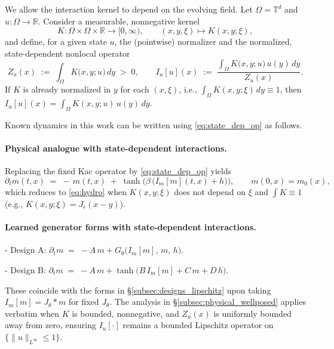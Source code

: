 \documentclass[11pt,a4paper]{article}
\theoremstyle{plain}
\theoremstyle{definition}
\theoremstyle{remark}
\begin{document}
We allow the interaction kernel to depend on the evolving field. Let $\Omega=\mathbb{T}^d$ and $u:\Omega\to\mathbb{R}$. Consider a measurable, nonnegative kernel
\[
	K: \Omega\times\Omega\times\mathbb{R} \to [0,\infty),\qquad (x,y,\xi)\mapsto K(x,y;\xi),
\]
and define, for a given state $u$, the (pointwise) normalizer and the normalized, state-dependent nonlocal operator
\begin{equation}
	Z_u(x) \;:=\; \int_{\Omega} K\big(x,y; u\big)\,dy\;>\;0,\qquad
	I_u[u](x) \;:=\; \frac{\displaystyle \int_{\Omega} K\big(x,y; u\big)\,u(y)\,dy}{\displaystyle Z_u(x)}.
	\label{eq:state_dep_op}
\end{equation}
If $K$ is already normalized in $y$ for each $(x,\xi)$, i.e., $\int_{\Omega}K(x,y;\xi)\,dy\equiv1$, then $I_u[u](x)=\int_{\Omega}K(x,y;u)\,u(y)\,dy$.

Known dynamics in this work can be written using \eqref{eq:state_dep_op} as follows.

\paragraph{Physical analogue with state-dependent interactions.}
Replacing the fixed Kac operator by \eqref{eq:state_dep_op} yields
\begin{equation}
	\partial_t m(t,x) \;=\; -\,m(t,x)\; +\; \tanh\!\Big( \beta\,\big( I_m[m](t,x) + h \big) \Big),
	\qquad m(0,x)=m_0(x),
	\label{eq:state_dep_physical}
\end{equation}
which reduces to \eqref{eq:hydro} when $K(x,y;\xi)$ does not depend on $\xi$ and $\int K\equiv1$ (e.g., $K(x,y;\xi)=J_\epsilon(x-y)$).

\paragraph{Learned generator forms with state-dependent interactions.}
- Design A: \; $\displaystyle \partial_t m \;=\; -A\,m + G_\theta\big( I_m[m],\, m,\, h \big)$.

- Design B: \; $\displaystyle \partial_t m \;=\; -A\,m + \tanh\!\big( B\,I_m[m] + C\,m + D\,h \big)$.

These coincide with the forms in \S\ref{subsec:designs_lipschitz} upon taking $I_m[m]=J_\theta*m$ for fixed $J_\theta$. The analysis in \S\ref{subsec:physical_wellposed} applies verbatim when $K$ is bounded, nonnegative, and $Z_u(x)$ is uniformly bounded away from zero, ensuring $I_u[\cdot]$ remains a bounded Lipschitz operator on $\{\|u\|_{L^\infty}\le 1\}$.
\end{document}
